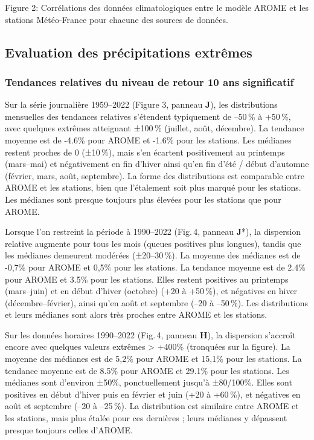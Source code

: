 \documentclass[
  article,
  nofooter,
  noheadings]{jss}
\begin{document}
\begin{center}
Figure 2: Corrélations des données climatologiques entre le modèle AROME et les stations Météo-France pour chacune des sources de données.
\end{center}

\subsection{Evaluation des précipitations
extrêmes}\label{evaluation-des-pruxe9cipitations-extruxeames}

\subsubsection{Tendances relatives du niveau de retour 10 ans
significatif}\label{tendances-relatives-du-niveau-de-retour-10-ans-significatif}

Sur la série journalière 1959--2022 (Figure 3, panneau \textbf{J}), les
distributions mensuelles des tendances relatives s'étendent typiquement
de --50\,\% à +50\,\%, avec quelques extrêmes atteignant ±100\,\%
(juillet, août, décembre). La tendance moyenne est de -4.6\% pour AROME
et -1.6\% pour les stations. Les médianes restent proches de 0
(±10\,\%), mais s'en écartent positivement au printemps (mars--mai) et
négativement en fin d'hiver ainsi qu'en fin d'été / début d'automne
(février, mars, août, septembre). La forme des distributions est
comparable entre AROME et les stations, bien que l'étalement soit plus
marqué pour les stations. Les médianes sont presque toujours plus
élevées pour les stations que pour AROME.

Lorsque l'on restreint la période à 1990--2022 (Fig.\,4, panneau
\textbf{J}*), la dispersion relative augmente pour tous les mois (queues
positives plus longues), tandis que les médianes demeurent modérées
(±20--30\,\%). La moyenne des médianes est de -0,7\% pour AROME et 0,5\%
pour les stations. La tendance moyenne est de 2.4\% pour AROME et 3.5\%
pour les stations. Elles restent positives au printemps (mars--juin) et
en début d'hiver (octobre) (+20 à +50\,\%), et négatives en hiver
(décembre--février), ainsi qu'en août et septembre (--20 à --50\,\%).
Les distributions et leurs médianes sont alors très proches entre AROME
et les stations.

Sur les données horaires 1990--2022 (Fig.\,4, panneau \textbf{H}), la
dispersion s'accroît encore avec quelques valeurs extrêmes
\textgreater{} +400\% (tronquées sur la figure). La moyenne des médianes
est de 5,2\% pour AROME et 15,1\% pour les stations. La tendance moyenne
est de 8.5\% pour AROME et 29.1\% pour les stations. Les médianes sont
d'environ ±50\%, ponctuellement jusqu'à ±80/100\%. Elles sont positives
en début d'hiver puis en février et juin (+20 à +60\,\%), et négatives
en août et septembre (--20 à --25\,\%). La distribution est similaire
entre AROME et les stations, mais plus étalée pour ces dernières ; leurs
médianes y dépassent presque toujours celles d'AROME.
\end{document}
